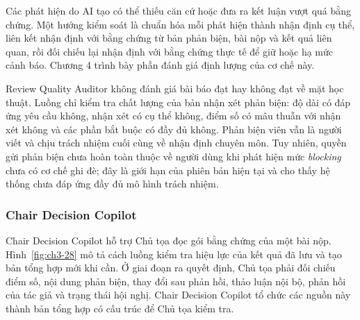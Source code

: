 Các phát hiện do AI tạo có thể thiếu căn cứ hoặc đưa ra kết luận vượt quá bằng chứng. Một hướng kiểm soát là chuẩn hóa mỗi phát hiện thành nhận định cụ thể, liên kết nhận định với bằng chứng từ bản phản biện, bài nộp và kết quả liên quan, rồi đối chiếu lại nhận định với bằng chứng thực tế để giữ hoặc hạ mức cảnh báo. Chương 4 trình bày phần đánh giá định lượng của cơ chế này.

Review Quality Auditor không đánh giá bài báo đạt hay không đạt về mặt học thuật. Luồng chỉ kiểm tra chất lượng của bản nhận xét phản biện: độ dài có đáp ứng yêu cầu không, nhận xét có cụ thể không, điểm số có mâu thuẫn với nhận xét không và các phần bắt buộc có đầy đủ không. Phản biện viên vẫn là người viết và chịu trách nhiệm cuối cùng về nhận định chuyên môn. Tuy nhiên, quyền gửi phản biện chưa hoàn toàn thuộc về người dùng khi phát hiện mức \textit{blocking} chưa có cơ chế ghi đè; đây là giới hạn của phiên bản hiện tại và cho thấy hệ thống chưa đáp ứng đầy đủ mô hình trách nhiệm.

\subsubsection{Chair Decision Copilot}

Chair Decision Copilot hỗ trợ Chủ tọa đọc gói bằng chứng của một bài nộp. Hình~\ref{fig:ch3-28} mô tả cách luồng kiểm tra hiệu lực của kết quả đã lưu và tạo bản tổng hợp mới khi cần. Ở giai đoạn ra quyết định, Chủ tọa phải đối chiếu điểm số, nội dung phản biện, thay đổi sau phản hồi, thảo luận nội bộ, phản hồi của tác giả và trạng thái hội nghị. Chair Decision Copilot tổ chức các nguồn này thành bản tổng hợp có cấu trúc để Chủ tọa kiểm tra.


